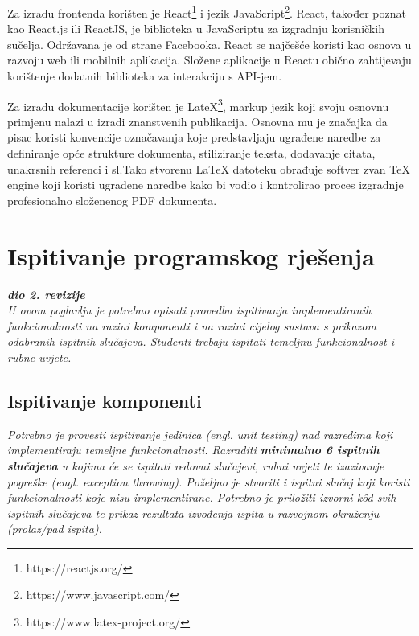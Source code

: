 			 Za izradu frontenda korišten je React\footnote{https://reactjs.org/} i jezik JavaScript\footnote{https://www.javascript.com/}. React, također poznat kao React.js ili ReactJS, je biblioteka u JavaScriptu za izgradnju korisničkih sučelja. Održavana je od strane Facebooka. React se najčešće koristi kao osnova u razvoju web ili mobilnih aplikacija. Složene aplikacije u Reactu obično zahtijevaju korištenje dodatnih biblioteka za interakciju s API-jem.		 
			 
			 Za izradu dokumentacije korišten je LateX\footnote{https://www.latex-project.org/}, markup jezik koji svoju osnovnu primjenu nalazi u izradi znanstvenih publikacija. Osnovna mu je značajka da pisac koristi konvencije označavanja koje predstavljaju ugrađene naredbe za definiranje opće strukture dokumenta, stiliziranje teksta, dodavanje citata, unakrsnih referenci i sl.Tako stvorenu LaTeX datoteku obrađuje softver zvan TeX engine koji koristi ugrađene naredbe kako bi vodio i kontrolirao proces izgradnje profesionalno složenenog PDF dokumenta.
			\eject 
		
	
		\section{Ispitivanje programskog rješenja}
			
			\textbf{\textit{dio 2. revizije}}\\
			
			 \textit{U ovom poglavlju je potrebno opisati provedbu ispitivanja implementiranih funkcionalnosti na razini komponenti i na razini cijelog sustava s prikazom odabranih ispitnih slučajeva. Studenti trebaju ispitati temeljnu funkcionalnost i rubne uvjete.}
	
			
			\subsection{Ispitivanje komponenti}
			\textit{Potrebno je provesti ispitivanje jedinica (engl. unit testing) nad razredima koji implementiraju temeljne funkcionalnosti. Razraditi \textbf{minimalno 6 ispitnih slučajeva} u kojima će se ispitati redovni slučajevi, rubni uvjeti te izazivanje pogreške (engl. exception throwing). Poželjno je stvoriti i ispitni slučaj koji koristi funkcionalnosti koje nisu implementirane. Potrebno je priložiti izvorni kôd svih ispitnih slučajeva te prikaz rezultata izvođenja ispita u razvojnom okruženju (prolaz/pad ispita). }
			
			
			
